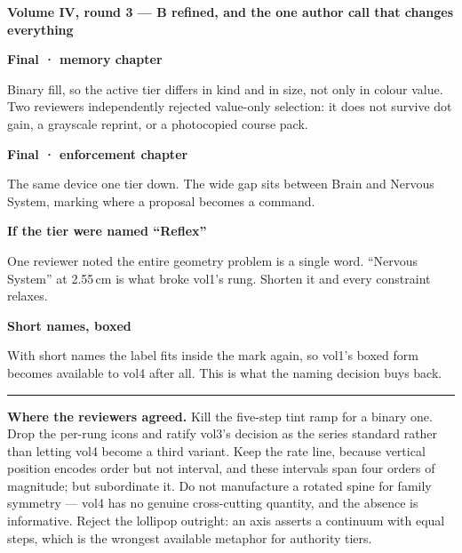 \documentclass[11pt]{book}
\begin{document}
\thispagestyle{empty}
{\large\bfseries Volume IV, round 3 --- B refined, and the one author call that changes everything}
\par\vspace{9mm}
\newcommand{\slot}[3]{\begin{minipage}[t][7.4cm][t]{5.0cm}#1\par\vspace{4mm}%
  {\footnotesize\bfseries #2}\par{\fontsize{7}{8.6}\selectfont #3}\end{minipage}}
\noindent
\slot{\fBrain}{Final · memory chapter}{Binary fill, so the active tier differs in kind and in
size, not only in colour value. Two reviewers independently rejected value-only selection: it
does not survive dot gain, a grayscale reprint, or a photocopied course pack.}\hfill
\slot{\fNerv}{Final · enforcement chapter}{The same device one tier down. The wide gap sits
between Brain and Nervous System, marking where a proposal becomes a command.}\hfill
\slot{\fShort}{If the tier were named ``Reflex''}{One reviewer noted the entire geometry
problem is a single word. ``Nervous System'' at 2.55\,cm is what broke vol1's rung. Shorten it
and every constraint relaxes.}\hfill
\slot{\fShortBox}{Short names, boxed}{With short names the label fits inside the mark again,
so vol1's boxed form becomes available to vol4 after all. This is what the naming decision
buys back.}
\par\vspace{2mm}\rule{\textwidth}{0.4pt}\par\vspace{2mm}
{\footnotesize\textbf{Where the reviewers agreed.} Kill the five-step tint ramp for a binary
one. Drop the per-rung icons and ratify vol3's decision as the series standard rather than
letting vol4 become a third variant. Keep the rate line, because vertical position encodes
order but not interval, and these intervals span four orders of magnitude; but subordinate it.
Do not manufacture a rotated spine for family symmetry --- vol4 has no genuine cross-cutting
quantity, and the absence is informative. Reject the lollipop outright: an axis asserts a
continuum with equal steps, which is the wrongest available metaphor for authority tiers.}
\end{document}
